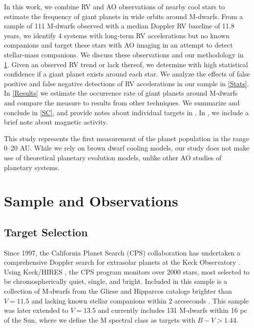 In this work, we combine RV and AO observations of nearby cool stars to estimate the frequency of giant planets in wide orbits around M-dwarfs. From a sample of 111 M-dwarfs observed with a median Doppler RV baseline of 11.8 years, we identify 4 systems with long-term RV accelerations but no known companions and target these stars with AO imaging in an attempt to detect stellar-mass companions. We discuss these observations and our methodology in \textsection\ref{SO}. Given an observed RV trend or lack thereof, we determine with high statistical confidence if a giant planet exists around each star. We analyze the effects of false positive and false negative detections of RV accelerations in our sample in \textsection\ref{Stats}. In \textsection\ref{Results} we estimate the occurrence rate of giant planets around M-dwarfs and compare the measure to results from other techniques. We summarize and conclude in \textsection\ref{SC}, and 
provide notes about individual targets in .
In , we include a brief note about magnetic activity.

 This study represents the first measurement of the planet population in the range 0--20 AU. While we rely on brown dwarf cooling models, our study does not make use of theoretical planetary evolution models, unlike other AO studies of planetary systems.

\section{Sample and Observations}
\label{SO}
\subsection{Target Selection}
\label{TS}

Since 1997, the California Planet Search (CPS) collaboration has undertaken a comprehensive Doppler search for extrasolar planets at the Keck Observatory \citep[e.g. ][]{Howard10}. Using Keck/HIRES \citep{Vogt94}, the CPS program monitors over 2000 stars, most selected to be chromospherically quiet, single, and bright. Included in this sample is a collection of M-dwarfs from the Gliese and Hipparcos catalogs brighter than $V = 11.5$ and lacking known stellar companions within 2 arcseconds \citep{Rauscher06}. This sample was later extended to $V = 13.5$ and currently includes 131 M-dwarfs within 16 pc of the Sun, where we define the M spectral class as targets with $B-V > 1.44$.

